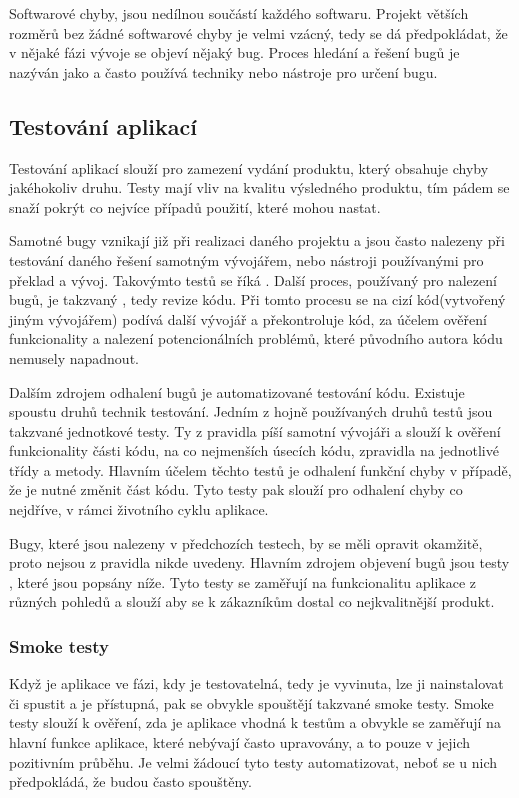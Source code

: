 \documentclass[czech,DP]{thesiskiv}
\begin{document}
Softwarové chyby, jsou nedílnou součástí každého softwaru. Projekt větších rozměrů bez žádné softwarové chyby je velmi vzácný, tedy se dá předpokládat, že v nějaké fázi vývoje se objeví nějaký bug. Proces hledání a řešení bugů je nazýván jako  a často používá techniky nebo nástroje pro určení bugu. 

\subsection{Testování aplikací}
Testování aplikací slouží pro zamezení vydání produktu, který obsahuje chyby jakéhokoliv druhu. Testy mají vliv na kvalitu výsledného produktu, tím pádem se snaží pokrýt co nejvíce případů použití, které mohou nastat.

Samotné bugy vznikají již při realizaci daného projektu a jsou často nalezeny při testování daného řešení samotným vývojářem, nebo nástroji používanými pro překlad a vývoj. Takovýmto testů se říká . Další proces, používaný pro nalezení bugů, je takzvaný , tedy revize kódu. Při tomto procesu se na cizí kód(vytvořený jiným vývojářem) podívá další vývojář a překontroluje kód, za účelem ověření funkcionality a nalezení potencionálních problémů, které původního autora kódu nemusely napadnout. 

Dalším zdrojem odhalení bugů je automatizované testování kódu. Existuje spoustu druhů technik testování. Jedním z hojně používaných druhů testů jsou takzvané jednotkové testy. Ty z pravidla píší samotní vývojáři a slouží k ověření funkcionality části kódu, na co nejmenších úsecích kódu, zpravidla na jednotlivé třídy a metody. Hlavním účelem těchto testů je odhalení funkční chyby v případě, že je nutné změnit část kódu. Tyto testy pak slouží pro odhalení chyby co nejdříve, v rámci životního cyklu aplikace. 

Bugy, které jsou nalezeny v předchozích testech, by se měli opravit okamžitě, proto nejsou z pravidla nikde uvedeny. Hlavním zdrojem objevení bugů jsou testy , které jsou popsány níže. Tyto testy se zaměřují na funkcionalitu aplikace z různých pohledů a slouží aby se k zákazníkům dostal co nejkvalitnější produkt.

\subsubsection*{Smoke testy}
Když je aplikace ve fázi, kdy je testovatelná, tedy je vyvinuta, lze ji nainstalovat či spustit a je přístupná, pak se obvykle spouštějí takzvané smoke testy. Smoke testy slouží k ověření, zda je aplikace vhodná k testům a obvykle se zaměřují na hlavní funkce aplikace, které nebývají často upravovány, a to pouze v jejich pozitivním průběhu. Je velmi žádoucí tyto testy automatizovat, neboť se u nich předpokládá, že budou často spouštěny.
\end{document}
